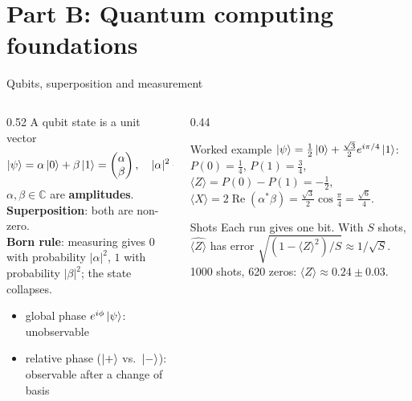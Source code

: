 \documentclass[aspectratio=169,11pt]{beamer}
\newcommand{\key}[1]{{\color{qdark}\textbf{#1}}}
\begin{document}
\section{Part B: Quantum computing foundations}
\begin{frame}[label=fQubit]{Qubits, superposition and measurement}
  \begin{columns}[T]
    \begin{column}{0.52\textwidth}
      \small
      A qubit state is a unit vector
      \[ \ket\psi = \alpha\ket0 + \beta\ket1 = \begin{pmatrix}\alpha\\ \beta\end{pmatrix},\quad |\alpha|^2 + |\beta|^2 = 1, \]
      $\alpha, \beta \in \mathbb C$ are \key{amplitudes}. \key{Superposition}: both are non-zero.\\[3pt]
      \key{Born rule}: measuring gives $0$ with probability $|\alpha|^2$, $1$ with probability $|\beta|^2$; the state collapses.
      \begin{itemize}\itemsep0pt
        \item global phase $e^{i\phi}\ket\psi$: unobservable
        \item relative phase ($\ket+$ vs.\ $\ket-$): observable after a change of basis
      \end{itemize}
    \end{column}
    \begin{column}{0.44\textwidth}
      \begin{exampleblock}{Worked example}
        \scriptsize $\ket\psi = \frac12\ket0 + \frac{\sqrt3}{2}e^{i\pi/4}\ket1$:\\
        $P(0) = \frac14$, $P(1) = \frac34$,\\
        $\langle Z\rangle = P(0) - P(1) = -\frac12$,\\
        $\langle X\rangle = 2\operatorname{Re}(\alpha^*\beta) = \frac{\sqrt3}{2}\cos\frac\pi4 = \frac{\sqrt6}{4}$.
      \end{exampleblock}
      \begin{block}{Shots}
        \scriptsize Each run gives one bit. With $S$ shots, $\widehat{\langle Z\rangle}$ has error $\sqrt{(1 - \langle Z\rangle^2)/S} \approx 1/\sqrt S$.
        1000 shots, 620 zeros: $\langle Z\rangle \approx 0.24 \pm 0.03$.
      \end{block}
    \end{column}
  \end{columns}
\end{frame}
\end{document}
